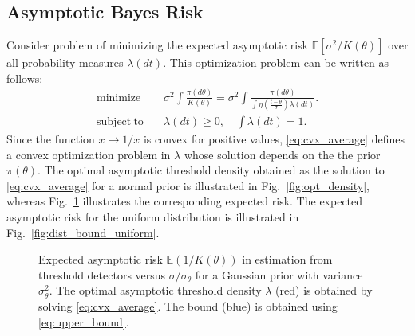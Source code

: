 \documentclass[letterpaper, conference]{IEEEtran}      %
\begin{document}
\subsection{Asymptotic Bayes Risk}
Consider problem of minimizing the expected asymptotic risk $\mathbb E[ \sigma^2/K(\theta)]$ over all probability measures $\lambda(dt)$. This optimization problem can be written as follows:
\begin{align}
\label{eq:cvx_average}
\mathrm{minimize} \quad &  \sigma^2 \int \frac{\pi(d\theta)}{K(\theta)} =  \sigma^2 \int \frac{\pi(d\theta)}{ \int \eta \left( \frac{t-\theta}{\sigma}\right) \lambda(dt)}. \\ \nonumber
\mathrm{subject~to} \quad & \lambda(dt)\geq 0,\quad \int \lambda(dt) =1. 
\end{align}
Since the function $x \rightarrow 1/x$ is convex for positive values, \eqref{eq:cvx_average} defines a convex optimization problem in $\lambda$ whose solution depends on the the prior $\pi(\theta)$. The optimal asymptotic threshold density obtained as the solution to \eqref{eq:cvx_average} for a normal prior is illustrated in Fig.~\ref{fig:opt_density}, whereas Fig.~\ref{fig:dist_bound_Gaussian} illustrates the corresponding expected risk. The expected asymptotic risk for the uniform distribution is illustrated in Fig.~\ref{fig:dist_bound_uniform}. 
\par
%
\begin{figure}
\begin{center}
\caption{Expected asymptotic risk $\mathbb E (1/K(\theta))$ in estimation from threshold detectors versus $\sigma/\sigma_\theta$ for a Gaussian prior with variance $\sigma_\theta^2$. The optimal asymptotic threshold density $\lambda$ (red) is obtained by solving \eqref{eq:cvx_average}. The bound (blue) is obtained using \eqref{eq:upper_bound}.
\label{fig:dist_bound_Gaussian}  }
\end{center}
\end{figure}
\end{document}
